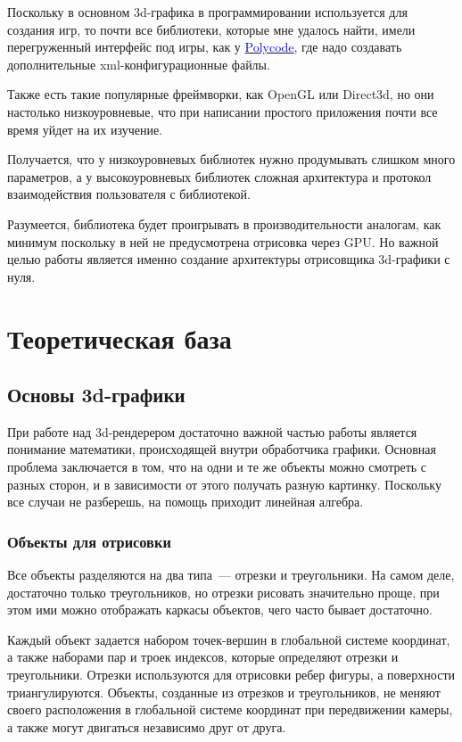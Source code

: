 \documentclass{article}
\begin{document}
Поскольку в основном 3d-графика в программировании используется для создания игр, то почти все библиотеки, которые мне удалось найти, имели перегруженный интерфейс под игры, как у \href{http://polycode.org/features/}{\textcolor{blue}{Polycode}}, где надо создавать дополнительные xml-конфигурационные файлы.

Также есть такие популярные фреймворки, как OpenGL или Direct3d, но они настолько низкоуровневые, что при написании простого приложения почти все время уйдет на их изучение.

Получается, что у низкоуровневых библиотек нужно продумывать слишком много параметров, а у высокоуровневых библиотек сложная архитектура и протокол взаимодействия пользователя с библиотекой.

Разумеется, библиотека будет проигрывать в производительности аналогам, как минимум поскольку в ней не предусмотрена отрисовка через GPU. Но важной целью работы является именно создание архитектуры отрисовщика 3d-графики с нуля.

\newpage

\section{Теоретическая база}

\subsection{Основы 3d-графики}

При работе над 3d-рендерером достаточно важной частью работы является понимание математики, происходящей внутри обработчика графики. Основная проблема заключается в том, что на одни и те же объекты можно смотреть с разных сторон, и в зависимости от этого получать разную картинку. Поскольку все случаи не разберешь, на помощь приходит линейная алгебра.

\subsubsection{Объекты для отрисовки}

Все объекты разделяются на два типа~--- отрезки и треугольники. На самом деле, достаточно только треугольников, но отрезки рисовать значительно проще, при этом ими можно отображать каркасы объектов, чего часто бывает достаточно.

Каждый объект задается набором точек-вершин в глобальной системе координат, а также наборами пар и троек индексов, которые определяют отрезки и треугольники. Отрезки используются для отрисовки ребер фигуры, а поверхности триангулируются. Объекты, созданные из отрезков и треугольников, не меняют своего расположения в глобальной системе координат при передвижении камеры, а также могут двигаться независимо друг от друга.
\end{document}
